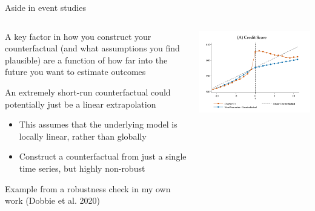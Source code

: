 \documentclass[notes,11pt, aspectratio=169]{beamer}
\newenvironment{wideitemize}{\itemize\addtolength{\itemsep}{10pt}}{\enditemize}
\begin{document}
\begin{frame}{Aside in event studies}
  \begin{columns}[T] %
    \begin{column}{0.5\textwidth}
  \begin{wideitemize}
  \item A key factor in how you construct your counterfactual (and
    what assumptions you find plausible) are a function of how far
    into the future you want to estimate outcomes
  \item An extremely short-run counterfactual could potentially just be a linear extrapolation
    \begin{itemize}
    \item This assumes that the underlying model is locally linear,
      rather than globally
    \item Construct a counterfactual from just
      a single time series, but highly non-robust
    \end{itemize}
  \item Example from a robustness check in my own work (Dobbie et al. 2020)
  \end{wideitemize}
    \end{column}%
    \hfill%
    \begin{column}{.5\textwidth}
\includegraphics[width=\linewidth]{images/badcredit3.png}        
    \end{column}%
  \end{columns}
  
\end{frame}
\end{document}
